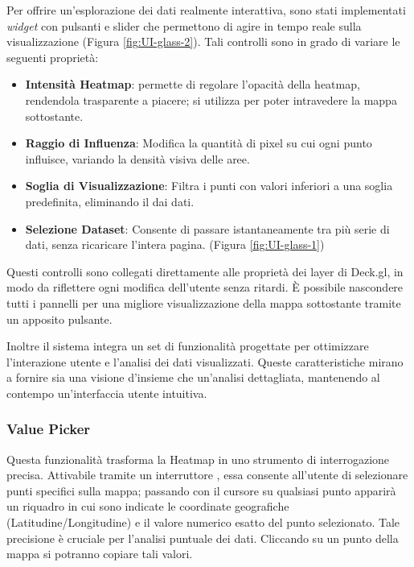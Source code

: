 Per offrire un'esplorazione dei dati realmente interattiva, sono stati
implementati \textit{widget} con pulsanti e slider che permettono di agire in tempo
reale sulla visualizzazione (Figura \ref{fig:UI-glass-2}). Tali controlli sono
in grado di variare le seguenti proprietà:

\begin{itemize}
  \item \textbf{Intensità Heatmap}: permette di regolare l'opacità della heatmap,
    rendendola trasparente a piacere; si utilizza per poter intravedere la mappa
    sottostante.

  \item \textbf{Raggio di Influenza}: Modifica la quantità di pixel su cui ogni punto
    influisce, variando la densità visiva delle aree.

  \item \textbf{Soglia di Visualizzazione}: Filtra i punti con valori inferiori a
    una soglia predefinita, eliminando il  dai dati.

  \item \textbf{Selezione Dataset}: Consente di passare istantaneamente tra più serie
    di dati, senza ricaricare l'intera pagina. (Figura \ref{fig:UI-glass-1})
\end{itemize}

\noindent
Questi controlli sono collegati direttamente alle proprietà dei layer di Deck.gl,
in modo da riflettere ogni modifica dell'utente senza ritardi. È possibile nascondere
tutti i pannelli per una migliore visualizzazione della mappa sottostante tramite
un apposito pulsante.

Inoltre il sistema integra un set di funzionalità progettate per ottimizzare l'interazione
utente e l'analisi dei dati visualizzati. Queste caratteristiche mirano a
fornire sia una visione d'insieme che un'analisi dettagliata, mantenendo al contempo
un'interfaccia utente intuitiva.

\subsubsection*{Value Picker}
Questa funzionalità trasforma la Heatmap in uno strumento di interrogazione precisa.
Attivabile tramite un interruttore , essa consente all'utente
di selezionare punti specifici sulla mappa; passando con il cursore su qualsiasi
punto apparirà un riquadro in cui sono indicate le coordinate geografiche (Latitudine/Longitudine)
e il valore numerico esatto del punto selezionato. Tale precisione è cruciale
per l'analisi puntuale dei dati. Cliccando su un punto della mappa si potranno copiare
tali valori.

